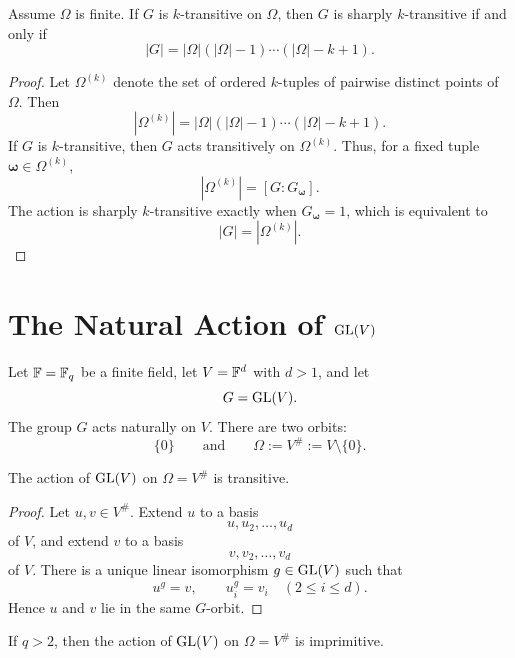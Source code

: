 \begin{lemma}
Assume \(\Omega\) is finite. If \(G\) is \(k\)-transitive on \(\Omega\), then \(G\) is
sharply \(k\)-transitive if and only if
\[
    |G|=|\Omega|(|\Omega|-1)\cdots(|\Omega|-k+1).
\]
\end{lemma}

\begin{proof}
Let \(\Omega^{(k)}\) denote the set of ordered \(k\)-tuples of pairwise distinct
points of \(\Omega\). Then
\[
    |\Omega^{(k)}|
    =
    |\Omega|(|\Omega|-1)\cdots(|\Omega|-k+1).
\]
If \(G\) is \(k\)-transitive, then \(G\) acts transitively on \(\Omega^{(k)}\).
Thus, for a fixed tuple \(\mathbf{\omega}\in \Omega^{(k)}\),
\[
    |\Omega^{(k)}|=[G:G_{\mathbf{\omega}}].
\]
The action is sharply \(k\)-transitive exactly when
\(G_{\mathbf{\omega}}=1\), which is equivalent to
\[
    |G|=|\Omega^{(k)}|.
\]
\end{proof}

\section{The Natural Action of \texorpdfstring{$\operatorname{GL}(V)$}{GL(V)}}

Let \(\mathbb{F}=\mathbb{F}_q\) be a finite field, let \(V=\mathbb{F}^d\) with \(d>1\), and let
\[
    G=\operatorname{GL}(V).
\]
The group \(G\) acts naturally on \(V\). There are two orbits:
\[
    \{0\}
    \qquad\text{and}\qquad
    \Omega:=V^\#:=V\setminus\{0\}.
\]

\begin{proposition}
The action of \(\operatorname{GL}(V)\) on \(\Omega=V^\#\) is transitive.
\end{proposition}

\begin{proof}
Let \(u,v\in V^\#\). Extend \(u\) to a basis
\[
    u,u_2,\ldots,u_d
\]
of \(V\), and extend \(v\) to a basis
\[
    v,v_2,\ldots,v_d
\]
of \(V\). There is a unique linear isomorphism \(g\in \operatorname{GL}(V)\) such that
\[
    u^g=v,\qquad u_i^g=v_i\quad(2\leq i\leq d).
\]
Hence \(u\) and \(v\) lie in the same \(G\)-orbit.
\end{proof}

\begin{proposition}
If \(q>2\), then the action of \(\operatorname{GL}(V)\) on \(\Omega=V^\#\) is imprimitive.
\end{proposition}

